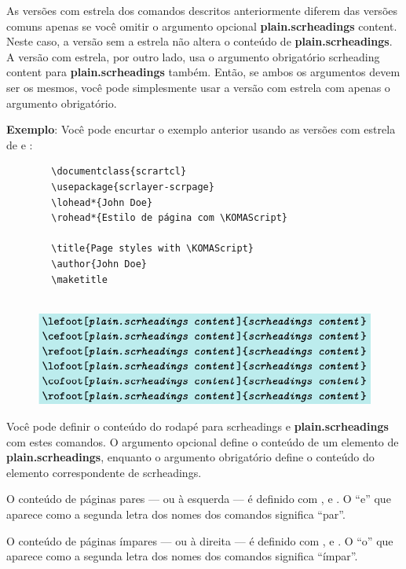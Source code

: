 As versões com estrela dos comandos descritos anteriormente diferem das versões comuns apenas se você omitir o argumento opcional \textbf{plain.scrheadings} content. Neste caso, a versão sem a estrela não altera o conteúdo de \textbf{plain.scrheadings}. A versão com estrela, por outro lado, usa o argumento obrigatório scrheading content para \textbf{plain.scrheadings} também. Então, se ambos os argumentos devem ser os mesmos, você pode simplesmente usar a versão com estrela com apenas o argumento obrigatório.

\textbf{Exemplo}: Você pode encurtar o exemplo anterior usando as versões com estrela de  e :
\begin{verbatim}
        \documentclass{scrartcl}
        \usepackage{scrlayer-scrpage}
        \lohead*{John Doe}
        \rohead*{Estilo de página com \KOMAScript}
        
        \title{Page styles with \KOMAScript}
        \author{John Doe}
        \maketitle
         
\end{verbatim}

\begin{figure}
    \centering
    \includegraphics[width=0.8\linewidth]{imagens/imagem26.png}
\end{figure}

Você pode definir o conteúdo do rodapé para scrheadings e \textbf{plain.scrheadings} com estes comandos. O argumento opcional define o conteúdo de um elemento de \textbf{plain.scrheadings}, enquanto o argumento obrigatório define o conteúdo do elemento correspondente de scrheadings.

O conteúdo de páginas pares --- ou à esquerda --- é definido com ,  e . O “e” que aparece como a segunda letra dos nomes dos comandos significa “par”.

O conteúdo de páginas ímpares --- ou à direita --- é definido com ,  e . O “o” que aparece como a segunda letra dos nomes dos comandos significa “ímpar”.


